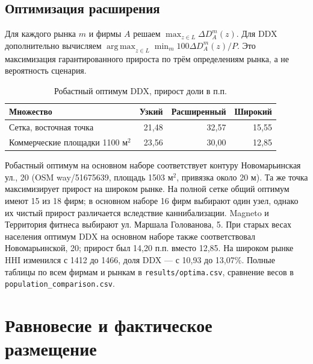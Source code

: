 \documentclass[12pt,a4paper]{article}
\newcommand{\argmax}{\operatorname*{arg\,max}}
\begin{document}
\subsection{Оптимизация расширения}
Для каждого рынка $m$ и фирмы $A$ решаем $\max_{z\in L}\Delta D_A^m(z)$. Для DDX дополнительно вычисляем $\argmax_{z\in L}\min_m 100\Delta D_A^m(z)/P$. Это максимизация гарантированного прироста по трём определениям рынка, а не вероятность сценария.
\begin{table}[H]\centering\caption{Робастный оптимум DDX, прирост доли в п.п.}\begin{tabularx}{\linewidth}{Yrrr}\toprule Множество & Узкий & Расширенный & Широкий\\\midrule Сетка, восточная точка & 21,48 & 32,57 & 15,55\\ Коммерческие площадки 1100 м$^2$ & 23,56 & 30,00 & 12,85\\\bottomrule\end{tabularx}\end{table}
Робастный оптимум на основном наборе соответствует контуру Новомарьинская ул., 20 (OSM way/51675639, площадь 1503 м$^2$, привязка около 20 м). Та же точка максимизирует прирост на широком рынке. На полной сетке общий оптимум имеют 15 из 18 фирм; в основном наборе 16 фирм выбирают один узел, однако их чистый прирост различается вследствие каннибализации. Magneto и Территория фитнеса выбирают ул. Маршала Голованова, 5. При старых весах населения оптимум DDX на основном наборе также соответствовал Новомарьинской, 20; прирост был 14,20 п.п. вместо 12,85. На широком рынке HHI изменился с 1412 до 1466, доля DDX --- с 10,93 до 13,07\%. Полные таблицы по всем фирмам и рынкам в \texttt{results/optima.csv}, сравнение весов в \texttt{population\_comparison.csv}.
\section{Равновесие и фактическое размещение}
\end{document}
